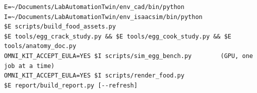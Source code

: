 \documentclass[10.5pt,a4paper]{article}
\begin{document}
\begin{Verbatim}[fontsize=\scriptsize,frame=lines]
E=~/Documents/LabAutomationTwin/env_cad/bin/python
I=~/Documents/LabAutomationTwin/env_isaacsim/bin/python
$E scripts/build_food_assets.py
$E tools/egg_crack_study.py && $E tools/egg_cook_study.py && $E tools/anatomy_doc.py
OMNI_KIT_ACCEPT_EULA=YES $I scripts/sim_egg_bench.py        (GPU, one job at a time)
OMNI_KIT_ACCEPT_EULA=YES $I scripts/render_food.py
$E report/build_report.py [--refresh]
\end{Verbatim}
\end{document}
